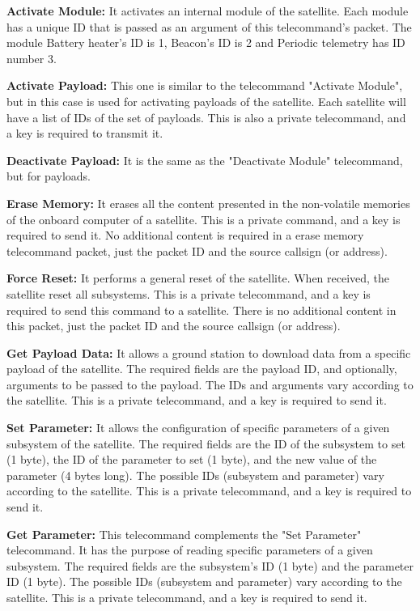 \textbf{Activate Module: }It activates an internal module of the satellite. Each module has a unique ID that is passed as an argument of this telecommand's packet. The module Battery heater's ID is 1, Beacon's ID is 2 and Periodic telemetry has ID number 3. 

\textbf{Activate Payload:} This one is similar to the telecommand "Activate Module", but in this case is used for activating payloads of the satellite. Each satellite will have a list of IDs of the set of payloads. This is also a private telecommand, and a key is required to transmit it.

\textbf{Deactivate Payload:} It is the same as the "Deactivate Module" telecommand, but for payloads.

\textbf{Erase Memory:} It erases all the content presented in the non-volatile memories of the onboard computer of a satellite. This is a private command, and a key is required to send it. No additional content is required in a erase memory telecommand packet, just the packet ID and the source callsign (or address).

\textbf{Force Reset:} It performs a general reset of the satellite. When received, the satellite reset all subsystems. This is a private telecommand, and a key is required to send this command to a satellite. There is no additional content in this packet, just the packet ID and the source callsign (or address).

\textbf{Get Payload Data:} It allows a ground station to download data from a specific payload of the satellite. The required fields are the payload ID, and optionally, arguments to be passed to the payload. The IDs and arguments vary according to the satellite. This is a private telecommand, and a key is required to send it.

\textbf{Set Parameter:} It allows the configuration of specific parameters of a given subsystem of the satellite. The required fields are the ID of the subsystem to set (1 byte), the ID of the parameter to set (1 byte), and the new value of the parameter (4 bytes long). The possible IDs (subsystem and parameter) vary according to the satellite. This is a private telecommand, and a key is required to send it.

\textbf{Get Parameter:} This telecommand complements the "Set Parameter" telecommand. It has the purpose of reading specific parameters of a given subsystem. The required fields are the subsystem's ID (1 byte) and the parameter ID (1 byte). The possible IDs (subsystem and parameter) vary according to the satellite. This is a private telecommand, and a key is required to send it.


